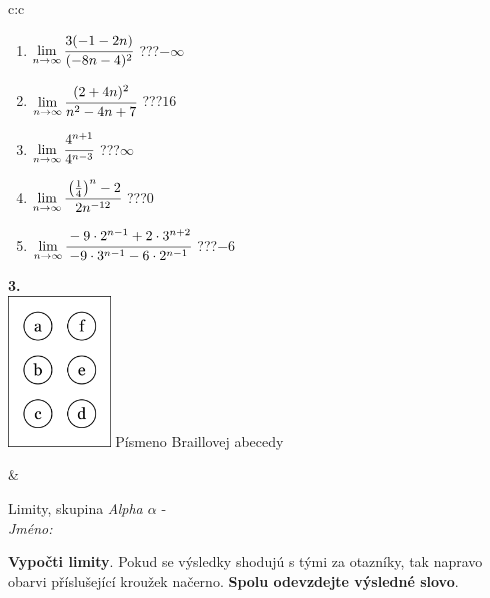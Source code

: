 \documentclass[10pt]{report}
\begin{document}
\begin{tabular}{c:c}
\begin{minipage}[c][104.5mm][t]{0.5\linewidth}
\begin{center}
\begin{minipage}{0.79\linewidth}
\begin{center}
\begin{varwidth}{\linewidth}
\begin{enumerate}
\item $\lim\limits_{n\to\infty}\cfrac{3(-1-2n)}{(-8n-4)^2}$\quad \dotfill\; ???\;\dotfill \quad $-\infty$
\item $\lim\limits_{n\to\infty}\cfrac{(2+4n)^2}{n^2-4n+7}$\quad \dotfill\; ???\;\dotfill \quad $16$
\item $\lim\limits_{n\to\infty}\cfrac{4^{n+1}}{4^{n-3}}$\quad \dotfill\; ???\;\dotfill \quad $\infty$
\item $\lim\limits_{n\to\infty}\cfrac{\left(\frac{1}{4}\right)^n -2}{2n^{-12}}$\quad \dotfill\; ???\;\dotfill \quad $0$
\item $\lim\limits_{n\to\infty}\cfrac{-9\cdot 2^{n-1}+2\cdot 3^{n+2}}{-9\cdot 3^{n-1}-6\cdot 2^{n-1}}$\quad \dotfill\; ???\;\dotfill \quad $-6$
\end{enumerate}
\end{varwidth}
\end{center}
\end{minipage}
\begin{minipage}{0.20\linewidth}
\begin{center}
{\Huge\bfseries 3.} \\[2mm]
\includegraphics[height=40mm]{../images/braille.png}
{\small Písmeno Braillovej abecedy}
\end{center}
\end{minipage}
\end{center}
\end{minipage}
&
\begin{minipage}[c][104.5mm][t]{0.5\linewidth}
\begin{center}
\vspace{7mm}
{\huge Limity, skupina \textit{Alpha $\alpha$} -}\\[5mm]
\textit{Jméno:}\phantom{xxxxxxxxxxxxxxxxxxxxxxxxxxxxxxxxxxxxxxxxxxxxxxxxxxxxxxxxxxxxxxxxx}\\[5mm]
\begin{minipage}{0.95\linewidth}
\begin{center}
\textbf{Vypočti limity}. Pokud se výsledky shodujú s tými za otazníky, tak napravo\\obarvi příslušející kroužek načerno. \textbf{Spolu odevzdejte výsledné slovo}.

\end{center}
\end{minipage}
\end{center}
\end{minipage}
\end{tabular}
\end{document}

